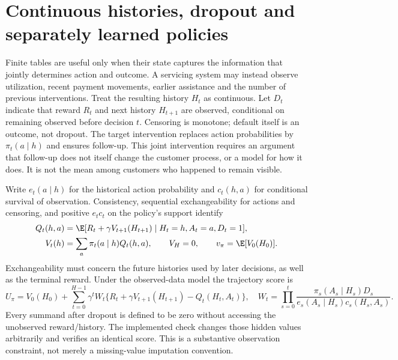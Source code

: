 \section{Continuous histories, dropout and separately learned policies}
\label{s5:history-censoring}
Finite tables are useful only when their state captures the information
that jointly determines action and outcome. A servicing system may instead
observe utilization, recent payment movements, earlier assistance and the
number of previous interventions. Treat the resulting history $H_t$ as
continuous. Let $D_t$ indicate that reward $R_t$ and next history $H_{t+1}$
are observed, conditional on remaining observed before decision $t$.
Censoring is monotone; default itself is an outcome, not dropout. The
target intervention replaces action probabilities by $\pi_t(a\mid h)$
and ensures follow-up. This joint intervention requires an argument that
follow-up does not itself change the customer process, or a model for how
it does. It is not the mean among customers who happened to remain visible.

Write $e_t(a\mid h)$ for the historical action probability and
$c_t(h,a)$ for conditional survival of observation. Consistency,
sequential exchangeability for actions and censoring, and positive
$e_tc_t$ on the policy's support identify
\begin{align}
 Q_t(h,a)&=\E[R_t+\gamma V_{t+1}(H_{t+1})\mid H_t=h,A_t=a,D_t=1],\\
 V_t(h)&=\sum_a\pi_t(a\mid h)Q_t(h,a),\qquad V_H=0,\qquad
 v_\pi=\E[V_0(H_0)].
 \label{s5:censor-recursion}
\end{align}
Exchangeability must concern the future histories used by later decisions,
as well as the terminal reward. Under the observed-data model the trajectory
score is
\begin{equation}
 U_\pi=V_0(H_0)+\sum_{t=0}^{H-1}\gamma^t W_t
       \{R_t+\gamma V_{t+1}(H_{t+1})-Q_t(H_t,A_t)\},\quad
 W_t=\prod_{s=0}^t\frac{\pi_s(A_s\mid H_s)D_s}
 {e_s(A_s\mid H_s)c_s(H_s,A_s)}.
 \label{s5:censor-score}
\end{equation}
Every summand after dropout is defined to be zero without accessing the
unobserved reward/history. The implemented check changes those hidden
values arbitrarily and verifies an identical score. This is a substantive
observation constraint, not merely a missing-value imputation convention.

